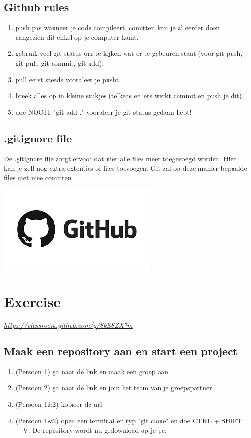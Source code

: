 \documentclass[a4paper, titlepage]{article}
\begin{document}
		\subsection{Github rules}
		\begin{enumerate}
			\item push pas wanneer je code compileert, comitten kan je al eerder doen aangezien dit enkel op je computer komt.
			\item gebruik veel git status om te kijken wat er te gebeuren staat (voor git push, git pull, git commit, git add).
			\item pull eerst steeds vooraleer je pusht.			
			\item breek alles op in kleine stukjes (telkens er iets werkt commit en push je dit).
			\item doe NOOIT "git add ." vooraleer je git status gedaan hebt!
		\end{enumerate}
		
		\subsection{.gitignore file}
			De .gitignore file zorgt ervoor dat niet alle files meer toegevoegd worden. Hier kan je zelf nog extra extenties of files toevoegen. Git zal op deze manier bepaalde files niet mee comitten.
		\pagebreak
	
	\includegraphics[scale=0.4]{img/github.png}
	\section{Exercise}
	\href{https://classroom.github.com/g/8kE8ZX7m}{\textit{https://classroom.github.com/g/8kE8ZX7m}}
		\subsection{Maak een repository aan en start een project}
			\begin{enumerate}
				\item (Persoon 1) ga naar de link en maak een groep aan
				\item (Persoon 2) ga naar de link en join het team van je groepspartner
				\item (Persoon 1\&2) kopieer de url
				\item (Persoon 1\&2) open een terminal en typ "git clone" en doe CTRL + SHIFT + V. De repository wordt nu gedownload op je pc.
			\end{enumerate}
\end{document}
